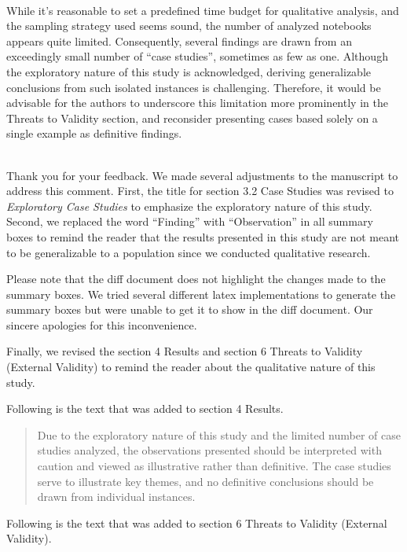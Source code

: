 \documentclass[11pt,fleqn]{article}
\newcommand{\eline}{\vspace*{.75\baselineskip}}
\newcommand{\Referee}[1]{\eline \noindent {\bf Reviewer comment #1:} \\}
\newcommand{\Us}{\eline \noindent {\bf Response:}\\}
\newenvironment{revcomment}[1][]
{\Referee{#1}\begin{rcomment}}
{\end{rcomment}}
\begin{document}
\begin{revcomment}[1.6]

  While it's reasonable to set a predefined time budget for qualitative analysis, and the sampling strategy used seems sound, the number of analyzed notebooks appears quite limited. Consequently, several findings are drawn from an exceedingly small number of ``case studies'', sometimes as few as one. Although the exploratory nature of this study is acknowledged, deriving generalizable conclusions from such isolated instances is challenging. Therefore, it would be advisable for the authors to underscore this limitation more prominently in the Threats to Validity section, and reconsider presenting cases based solely on a single example as definitive findings.
\end{revcomment}

\Us Thank you for your feedback. We made several adjustments to the manuscript to address this comment. First, the title for section 3.2 Case Studies was revised to \emph{Exploratory Case Studies} to emphasize the exploratory nature of this study. Second, we replaced the word ``Finding'' with ``Observation'' in all summary boxes to remind the reader that the results presented in this study are not meant to be generalizable to a population since we conducted qualitative research.

Please note that the diff document does not highlight the changes made to the summary boxes. We tried several different latex implementations to generate the summary boxes but were unable to get it to show in the diff document. Our sincere apologies for this inconvenience.

Finally, we revised the section 4 Results and section 6 Threats to Validity (External Validity) to remind the reader about the qualitative nature of this study.

Following is the text that was added to section 4 Results.

\begin{quote}
  Due to the exploratory nature of this study and the limited number of case studies analyzed, the observations presented should be interpreted with caution and viewed as illustrative rather than definitive. The case studies serve to illustrate key themes, and no definitive conclusions should be drawn from individual instances.
\end{quote}

Following is the text that was added to section 6 Threats to Validity (External Validity).
\end{document}
